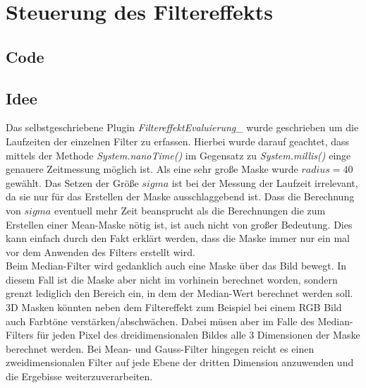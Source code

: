 \documentclass[12pt,german]{article}
\begin{document}
\newpage
\section{Steuerung des Filtereffekts }
\subsection{Code}

\subsection{Idee}
Das selbstgeschriebene Plugin \textit{FiltereffektEvaluierung\_} wurde geschrieben um die Laufzeiten der einzelnen Filter zu erfassen. Hierbei wurde darauf geachtet, dass mittels der Methode \textit{System.nanoTime()} im Gegensatz zu \textit{System.millis()} einge genauere Zeitmessung möglich ist. Als eine sehr große Maske wurde $  radius = 40 $ gewählt. Das Setzen der Größe $ sigma $ ist bei der Messung der Laufzeit irrelevant, da sie nur für das Erstellen der Maske ausschlaggebend ist. Dass die Berechnung von $ sigma $ eventuell mehr Zeit beansprucht als die Berechnungen die zum Erstellen einer Mean-Maske nötig ist, ist auch nicht von großer Bedeutung. Dies kann einfach durch den Fakt erklärt werden, dass die Maske immer nur ein mal vor dem Anwenden des Filters erstellt wird. \\
Beim Median-Filter wird gedanklich auch eine Maske über das Bild bewegt. In diesem Fall ist die Maske aber nicht im vorhinein berechnet worden, sondern grenzt lediglich den Bereich ein, in dem der Median-Wert berechnet werden soll. \\
3D Masken könnten neben dem Filtereffekt zum Beispiel bei einem RGB Bild auch Farbtöne verstärken/abschwächen. Dabei müsen aber im Falle des Median-Filters für jeden Pixel des dreidimensionalen Bildes alle 3 Dimensionen der Maske berechnet werden. Bei Mean- und Gauss-Filter hingegen reicht es einen zweidimensionalen Filter auf jede Ebene der dritten Dimension anzuwenden und die Ergebisse weiterzuverarbeiten. 
\end{document}
